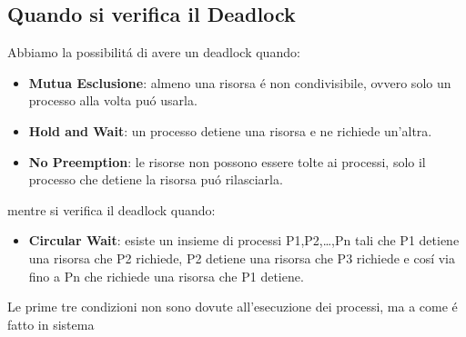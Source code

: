 \subsection{Quando si verifica il Deadlock}
Abbiamo la possibilitá di avere un deadlock quando:
\begin{itemize}
    \item \textbf{Mutua Esclusione}: almeno una risorsa é non condivisibile, ovvero solo un processo alla volta puó usarla.
    \item \textbf{Hold and Wait}: un processo detiene una risorsa e ne richiede un'altra.
    \item \textbf{No Preemption}: le risorse non possono essere tolte ai processi, solo il processo che detiene la risorsa puó rilasciarla.
\end{itemize}
mentre si verifica il deadlock quando:
\begin{itemize}
    \item \textbf{Circular Wait}: esiste un insieme di processi P1,P2,\dots,Pn tali che P1 detiene una risorsa che P2 richiede, P2 detiene una risorsa che P3 richiede e cosí via fino a Pn che richiede una risorsa che P1 detiene.
\end{itemize}
Le prime tre condizioni non sono dovute all'esecuzione dei processi, ma a come é fatto in sistema
























